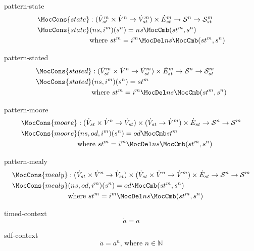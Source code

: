 \documentclass[preview]{standalone}
\begin{document}
\begin{docimage}{pattern-state}
  \begin{align*}%
    \MocCons{state} &:({\dot{V}^m_{st} \times  \dot{V}^n \rightarrow \dot{V}^m_{st}})
                      \times \dot{E}^m_{st}
                      \rightarrow \mathcal{S}^n \rightarrow \mathcal{S}^m_{st} \\
    \MocCons{state} &(ns,i^m)(s^n) = ns \MocCmb (st^m, s^n) \\
                    &\text{where}\ st^m = i^m \MocDel ns \MocCmb (st^m, s^n) 
  \end{align*}
\end{docimage}

\begin{docimage}{pattern-stated}
  \begin{align*}%
    \MocCons{stated} &:({\dot{V}^m_{st} \times  \dot{V}^n \rightarrow \dot{V}^m_{st}})
                      \times \dot{E}^m_{st}
                      \rightarrow \mathcal{S}^n \rightarrow \mathcal{S}^m_{st} \\
    \MocCons{stated} &(ns,i^m)(s^n) = st^m \\
                    &\text{where}\ st^m = i^m \MocDel ns \MocCmb (st^m, s^n) 
  \end{align*}
\end{docimage}

\begin{docimage}{pattern-moore}
  \begin{align*}%
    \MocCons{moore} &:({\dot{V}_{st} \times  \dot{V}^n \rightarrow \dot{V}_{st}})
                      \times ({\dot{V}_{st} \rightarrow \dot{V}^m})
                      \times \dot{E}_{st}
                      \rightarrow \mathcal{S}^n \rightarrow \mathcal{S}^m \\
    \MocCons{moore} &(ns,od,i^m)(s^n) = od \MocCmb st^m \\
                    &\text{where}\ st^m = i^m \MocDel ns \MocCmb (st^m, s^n) 
  \end{align*}
\end{docimage}

\begin{docimage}{pattern-mealy}
  \begin{align*}%
    \MocCons{mealy} &:({\dot{V}_{st} \times  \dot{V}^n \rightarrow \dot{V}_{st}})
                      \times ({\dot{V}_{st} \times \dot{V}^n \rightarrow \dot{V}^m})
                      \times \dot{E}_{st}
                      \rightarrow \mathcal{S}^n \rightarrow \mathcal{S}^m \\
    \MocCons{mealy} &(ns,od,i^m)(s^n) = od \MocCmb (st^m, s^n) \\
                    &\text{where}\ st^m = i^m \MocDel ns \MocCmb (st^m, s^n) 
  \end{align*}
\end{docimage}

\begin{docimage}{timed-context}
  \begin{equation*}%
    \dot{a} = a  
  \end{equation*}
\end{docimage} 

\begin{docimage}{sdf-context}
  \begin{equation*}%
    \dot{a} = a^n \text{, where } n \in \mathbb{N} 
  \end{equation*}
\end{docimage} 
\end{document}

